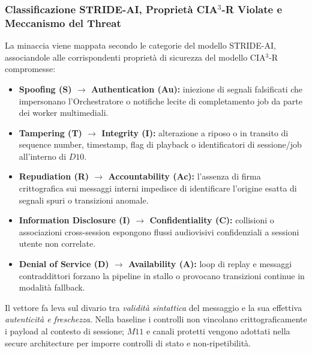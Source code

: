 \documentclass[11pt,a4paper]{article}
\begin{document}
\subsubsection{Classificazione STRIDE-AI, Proprietà CIA$^3$-R Violate e Meccanismo del Threat}

La minaccia viene mappata secondo le categorie del modello STRIDE-AI, associandole alle
corrispondenti proprietà di sicurezza del modello CIA$^3$-R compromesse:

\begin{itemize}
    \item \textbf{Spoofing (S) $\to$ Authentication (Au):} iniezione di segnali falsificati che impersonano l'Orchestratore o notifiche lecite di completamento job da parte dei worker multimediali.
    \item \textbf{Tampering (T) $\to$ Integrity (I):} alterazione a riposo o in transito di sequence number, timestamp, flag di playback o identificatori di sessione/job all'interno di $D10$.
    \item \textbf{Repudiation (R) $\to$ Accountability (Ac):} l'assenza di firma crittografica sui messaggi interni impedisce di identificare l'origine esatta di segnali spuri o transizioni anomale.
    \item \textbf{Information Disclosure (I) $\to$ Confidentiality (C):} collisioni o associazioni cross-session espongono flussi audiovisivi confidenziali a sessioni utente non correlate.
    \item \textbf{Denial of Service (D) $\to$ Availability (A):} loop di replay e messaggi contraddittori forzano la pipeline in stallo o provocano transizioni continue in modalità fallback.
\end{itemize}

Il vettore fa leva sul divario tra \emph{validità sintattica} del messaggio e la sua effettiva \emph{autenticità e freschezza}. Nella baseline i controlli non vincolano crittograficamente i payload al contesto di sessione; $M11$ e canali protetti vengono adottati nella secure architecture per imporre controlli di stato e non-ripetibilità.
\end{document}
